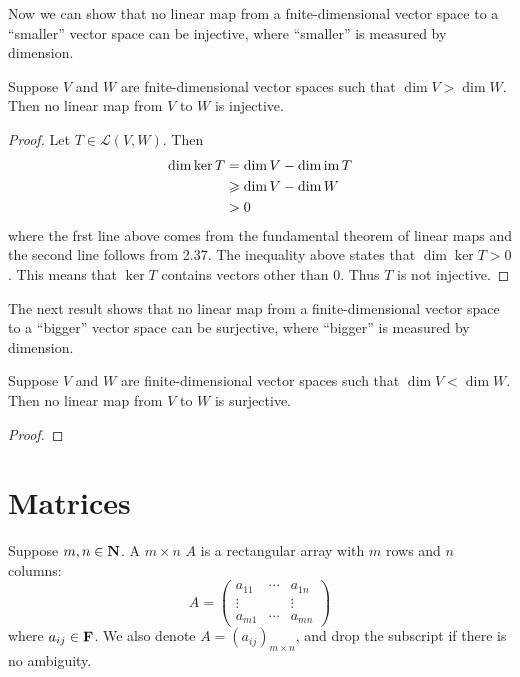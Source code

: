 Now we can show that no linear map from a fnite-dimensional vector space to a ``smaller'' vector space can be injective, where ``smaller'' is measured by dimension.

\begin{proposition}
Suppose $V$ and $W$ are fnite-dimensional vector spaces such that $\dim V>\dim W$. Then no linear map from $V$ to $W$ is injective.
\end{proposition}

\begin{proof}
Let $T\in\mathcal{L}(V,W)$. Then
\begin{align*}
\dim\ker T
&=\dim V-\dim\operatorname{im} T\\
&\geqslant\dim V-\dim W\\
&>0
\end{align*}
where the frst line above comes from the fundamental theorem of linear maps and the second line follows from 2.37. The inequality above states that $\dim\ker T>0$. This means that $\ker T$ contains vectors other than $0$. Thus $T$ is not injective.
\end{proof}

The next result shows that no linear map from a finite-dimensional vector space to a ``bigger'' vector space can be surjective, where ``bigger'' is measured by dimension.

\begin{proposition}
Suppose $V$ and $W$ are finite-dimensional vector spaces such that $\dim V<\dim W$. Then no linear map from $V$ to $W$ is surjective.
\end{proposition}

\begin{proof}

\end{proof}

\section{Matrices}
\begin{definition}[Matrix]
Suppose $m,n\in\mathbf N$. A $m\times n$  $A$ is a rectangular array with $m$ rows and $n$ columns:
\[A=\begin{pmatrix}
a_{11} & \cdots & a_{1n}\\
\vdots & & \vdots\\
a_{m1} & \cdots & a_{mn}
\end{pmatrix}\]
where $a_{ij}\in\mathbf F$. We also denote $A=(a_{ij})_{m\times n}$, and drop the subscript if there is no ambiguity.
\end{definition}

